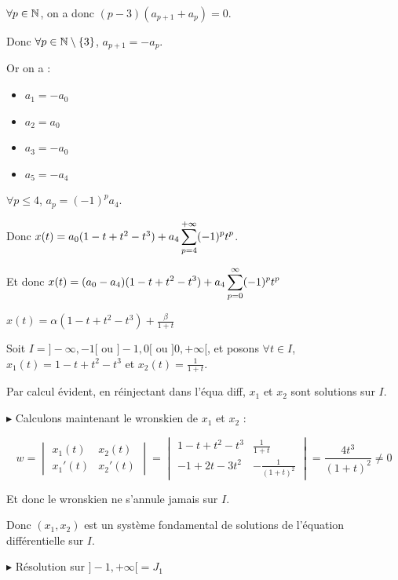 \begin{exemple}
    $\forall p \in \mathbb{N}$, on a donc $(p - 3)(a_{p + 1} + a_p) = 0$.

    Donc $\forall p \in \mathbb{N} \setminus \{ 3 \}$, $a_{p + 1} = - a_p$. 

    Or on a : 
    \begin{itemize}
        \item $a_1 = -a_0$
        \item $a_2 = a_0$
        \item $a_3 = -a_0$
        \item $a_5 = -a_4$
    \end{itemize}

    $\forall p \leqslant 4$, $a_p = (-1)^p a_4$. 

    Donc $x(t) = a_0 (1 -t + t^2 - t^3) + a_4 \displaystyle \sum_{p = 4}^{+ \infty} (-1)^p t^p$.

    Et donc $x(t) = \displaystyle (a_0 - a_4)(1 - t + t^2 - t^3) + a_4 \sum_{p = 0}^{\infty} (-1)^p t^p$

    $x(t) = \alpha (1 - t + t^2 - t^3) + \frac \beta {1 + t}$

    Soit $I = ] - \infty, -1[$ ou $ ]-1, 0[$ ou $] 0, + \infty[$, et posons 
    $\forall t \in I$, $x_1(t) = 1 - t + t^2 - t^3$ et $x_2(t) = \frac 1 {1 + t}$. 

    Par calcul évident, en réinjectant dans l'équa diff, $x_1$ et $x_2$ sont solutions
    sur $I$.

    \avspace $\blacktriangleright$ Calculons maintenant le wronskien de $x_1$ et $x_2$ :

    $$w = \begin{vmatrix}
        x_1(t) & x_2(t) \\
        x_1'(t) & x_2'(t)
    \end{vmatrix} = \begin{vmatrix}
        1 - t + t^2 - t^3 & \frac 1 {1 + t} \\
        -1 + 2t - 3t^2 & -\frac 1 {(1 + t)^2}
    \end{vmatrix} = \frac {4t^3} {(1 + t)^2} \neq 0$$

    Et donc le wronskien ne s'annule jamais sur $I$. 

    Donc $(x_1, x_2)$ est un système fondamental de solutions de l'équation différentielle sur $I$.

    \lvspace \avspace {}

    \lvspace $\blacktriangleright$ Résolution sur $]-1, +\infty[ = J_1$


\end{exemple}
